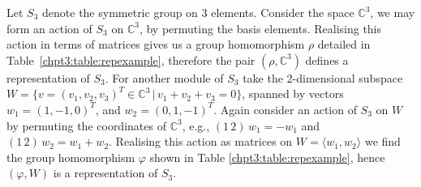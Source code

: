 \documentclass[11pt]{report}
\begin{document}
\begin{example}
	Let $S_{3}$ denote the symmetric group on $3$ elements.  	Consider the space $\mathbb{C}^{3}$, we may form an action of $S_{3}$ on $\mathbb{C}^{3}$, by permuting the basis elements. Realising this action in terms of matrices gives us a group homomorphism $\rho$ detailed in Table~\ref{chpt3:table:repexample}, therefore the pair $(\rho, \mathbb{C}^{3})$ defines a representation of $S_{3}$.	For another module of $S_{3}$ take the 2-dimensional subspace $W = \{v =(v_{1},v_{2},v_{3})^{T} \in \mathbb{C}^{3} \, | \, v_{1}+v_{2}+v_{3} = 0\}$, spanned by vectors $w_{1} = (1, -1,0)^{T}$, and $w_{2} = (0, 1,-1)^{T}$. Again consider an action of $S_{3}$ on $W$ by permuting the coordinates of $\mathbb{C}^{3}$, e.g., $(1\,2) \, w_{1} = -w_{1}$ and $(1 \, 2) \,w_{2} = w_{1} + w_{2}$. Realising this action as matrices on $W = \langle w_{1}, w_{2}\rangle$ we find the group homomorphism $\varphi$ shown in Table \ref{chpt3:table:repexample},  hence $(\varphi,W)$ is a representation of $S_{3}$. 
	

\end{example}
\end{document}
